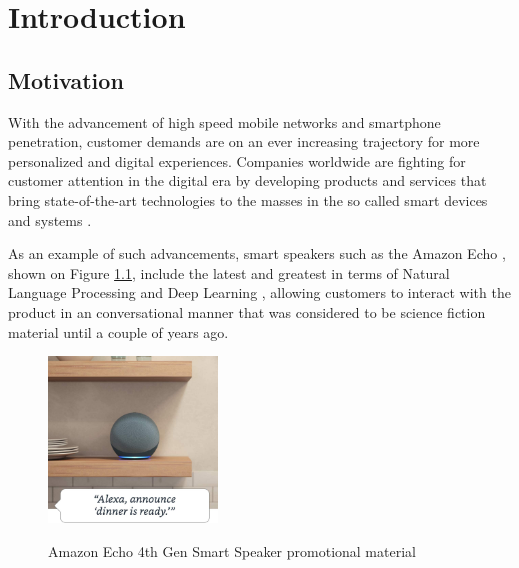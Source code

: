 
\chapter{Introduction}\label{cap:introducao}

\section{Motivation}

With the advancement of high speed mobile networks and smartphone penetration,
customer demands are on an ever increasing trajectory for more personalized and
digital experiences. Companies worldwide are fighting for customer attention in 
the digital era by developing products and services that bring state-of-the-art 
technologies to the masses in the so called smart devices and systems \cite{Shafique2020}.

As an example of such advancements, smart speakers such as the Amazon Echo
\cite{GaoPanWangChen2018}, shown on Figure \ref{fig:echodot4}, include the latest and greatest in terms of Natural
Language Processing and Deep Learning \cite{Young2018}, allowing customers to
interact with the product in an conversational manner that was considered to be
science fiction material until a couple of years ago.

\begin{figure}[!htb]
	\centering
	\caption[Amazon Echo 4th Generation smart speaker promotional material]{Amazon Echo 4th Gen Smart Speaker promotional material}
	\includegraphics[width=0.4\textwidth]{./images/echodot4.jpg} %
	\label{fig:echodot4}
\end{figure}

